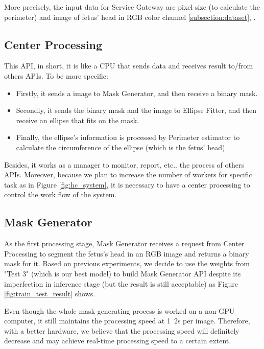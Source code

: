 	More precisely, the input data for Service Gateway are pixel size (to calculate the perimeter) and image of fetus' head in RGB color channel \ref{subsection:dataset}, .
	
\subsection{Center Processing}
\noindent

	This API, in short, it is like a CPU that sends data and receives result to/from others APIs. To be more specific:
	
	\begin{itemize}
		\item Firstly, it sends a image to Mask Generator, and then receive a binary mask.
		\item Secondly, it sends the binary mask and the image to Ellipse Fitter, and then receive an ellipse that fits on the mask.
		\item Finally, the ellipse's information is processed by Perimeter estimator to calculate the circumference of the ellipse (which is the fetus' head).
	\end{itemize}
	
	Besides, it works as a manager to monitor, report, etc.. the process of others APIs. Moreover, because we plan to increase the number of workers for specific task as in Figure \ref{fig:hc_system}, it is necessary to have a center processing to control the work flow of the system.

\subsection{Mask Generator}
\noindent
	
	As the first processing stage, Mask Generator receives a request from Center Processing to segment the fetus's head in an RGB image and returns a binary mask for it. Based on previous experiments, we decide to use the weights from "Test 3" (which is our best model) to build Mask Generator API despite its imperfection in inference stage (but the result is still acceptable) as Figure \ref{fig:train_test_result} shows. 
	
	Even though the whole mask generating process is worked on a non-GPU computer, it still maintains the processing speed at 1~2s per image. Therefore, with a better hardware, we believe that the processing speed will definitely decrease and may achieve real-time processing speed to a certain extent.
	
